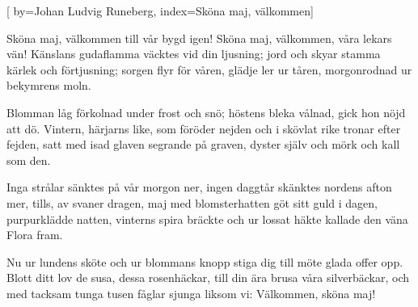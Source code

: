 

[
by={Johan Ludvig Runeberg},
index={Sköna maj, välkommen}]

\beginverse* 
Sköna maj, välkommen
till vår bygd igen!
Sköna maj, välkommen,
våra lekars vän!
Känslans gudaflamma
väcktes vid din ljusning;
jord och skyar stamma
kärlek och förtjusning;
sorgen flyr för våren,
glädje ler ur tåren,
morgonrodnad ur bekymrens moln.
\endverse

\beginverse* 
Blomman låg förkolnad
under frost och snö;
höstens bleka vålnad,
gick hon nöjd att dö.
Vintern, härjarns like,
som föröder nejden
och i skövlat rike
tronar efter fejden,
satt med isad glaven
segrande på graven,
dyster själv och mörk och kall som den.
\endverse

\beginverse* 
Inga strålar sänktes
på vår morgon ner,
ingen daggtår skänktes
nordens afton mer,
tills, av svaner dragen,
maj med blomsterhatten
göt sitt guld i dagen,
purpurklädde natten,
vinterns spira bräckte
och ur lossat häkte
kallade den väna Flora fram.
\endverse

\beginverse*
Nu ur lundens sköte
och ur blommans knopp
stiga dig till möte
glada offer opp.
Blott ditt lov de susa,
dessa rosenhäckar,
till din ära brusa
våra silverbäckar,
och med tacksam tunga
tusen fåglar sjunga
liksom vi: Välkommen, sköna maj! 
\endverse
\endsong


